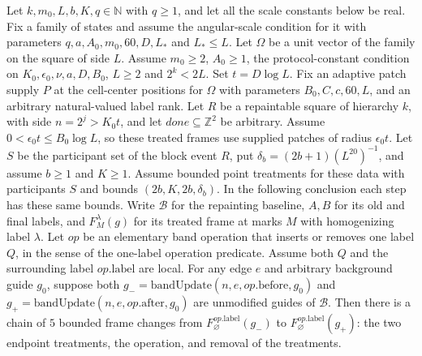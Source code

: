 \begin{lemma}
    \label{thm:peps_protocol_band_operation_chain}
    \leanok
    Let $k,m_0,L,b,K,q\in\mathbb N$ with $q\ge1$, and let all the scale
    constants below be real. Fix a family of states and assume the angular-scale
    condition for it with parameters $q,a,A_0,m_0,60,D,L_*$ and $L_*\le L$. Let
    $\Omega$ be a unit vector of the family on the square of side $L$. Assume $m_0\ge2$,
    $A_0\ge1$, the protocol-constant condition on $K_0,\epsilon_0,\nu,a,D,B_0$,
    $L\ge2$ and $2^k<2L$. Set $t=D\log L$. Fix an adaptive patch supply
    $P$ at the cell-center positions for $\Omega$ with parameters
    $B_0,C,c,60,L$, and an arbitrary natural-valued label rank.
    Let $R$ be a repaintable square of hierarchy $k$, with side $n=2^j>K_0t$,
    and let $\mathit{done}\subseteq\mathbb Z^2$ be arbitrary. Assume
    $0<\epsilon_0t\le B_0\log L$, so these treated frames use supplied
    patches of radius $\epsilon_0t$.
    Let $S$ be the participant set of the block event $R$, put
    $\delta_b=(2b+1)(L^{20})^{-1}$, and assume $b\ge1$ and $K\ge1$.
    Assume bounded point treatments for these data with participants $S$ and
    bounds $(2b,K,2b,\delta_b)$. In the following conclusion each step has
    these same bounds. Write $\mathcal B$ for the repainting baseline,
    $A,B$ for its old and final labels, and $F_M^\lambda(g)$ for its treated
    frame at marks $M$ with homogenizing label $\lambda$.
    Let $\mathit{op}$ be an elementary band operation that inserts or removes
    one label $Q$, in the sense of the one-label operation predicate. Assume
    both $Q$ and the surrounding label $\mathit{op}.\mathrm{label}$ are local.
    For any edge $e$ and arbitrary background guide $g_0$, suppose both
    $g_-=\mathrm{bandUpdate}(n,e,\mathit{op}.\mathrm{before},g_0)$ and
    $g_+=\mathrm{bandUpdate}(n,e,\mathit{op}.\mathrm{after},g_0)$ are unmodified
    guides of $\mathcal B$. Then there is a chain of $5$ bounded frame changes
    from $F_\varnothing^{\mathit{op}.\mathrm{label}}(g_-)$ to
    $F_\varnothing^{\mathit{op}.\mathrm{label}}(g_+)$: the two endpoint
    treatments, the operation, and removal of the treatments.
\end{lemma}

